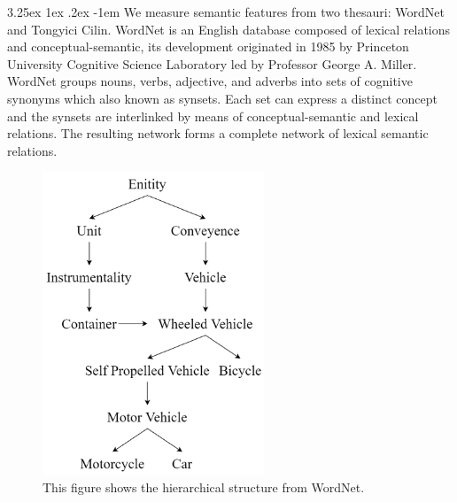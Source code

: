 \documentclass[12pt]{article}
\makeatletter
\renewcommand\paragraph{\@startsection{paragraph}{5}{\z@}%
  {3.25ex \@plus1ex \@minus.2ex}%
  {-1em}%
  {\normalfont\normalsize\bfseries}}
\makeatother
\begin{document}
\begin{CJK*}{UTF8}{bkai}
\begin{spacing}{1.77}
\paragraph{}
We measure semantic features from two thesauri: WordNet and Tongyici Cilin. WordNet\cite{wordnet} is an English database composed of lexical relations and conceptual-semantic, its development originated in 1985 by Princeton University Cognitive Science Laboratory led by Professor George A. Miller. WordNet groups nouns, verbs, adjective, and adverbs into sets of cognitive synonyms which also known as synsets. Each set can express a distinct concept and the synsets are interlinked by means of conceptual-semantic and lexical relations. The resulting network forms a complete network of lexical semantic relations.

\begin{figure}
  \centering
  \includegraphics[width=250px]{WordNet.png}
  \caption[Word-Alignment Groups]{This figure shows the hierarchical structure from WordNet.}
  \label{fig:wordnet}
\end{figure}


\end{spacing}
\end{CJK*}
\end{document}

